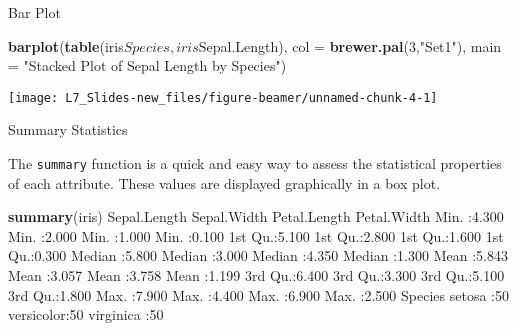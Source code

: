 \documentclass[ignorenonframetext,]{beamer}
\newenvironment{Shaded}{\begin{snugshade}}{\end{snugshade}}
\newcommand{\KeywordTok}[1]{\textcolor[rgb]{0.13,0.29,0.53}{\textbf{{#1}}}}
\newcommand{\DataTypeTok}[1]{\textcolor[rgb]{0.13,0.29,0.53}{{#1}}}
\newcommand{\DecValTok}[1]{\textcolor[rgb]{0.00,0.00,0.81}{{#1}}}
\newcommand{\FloatTok}[1]{\textcolor[rgb]{0.00,0.00,0.81}{{#1}}}
\newcommand{\StringTok}[1]{\textcolor[rgb]{0.31,0.60,0.02}{{#1}}}
\newcommand{\NormalTok}[1]{{#1}}
\begin{document}
\begin{frame}[fragile]{Bar Plot}

\small

\begin{Shaded}
\begin{Highlighting}[]
\KeywordTok{barplot}\NormalTok{(}\KeywordTok{table}\NormalTok{(iris$Species,iris$Sepal.Length), }
        \DataTypeTok{col  =} \KeywordTok{brewer.pal}\NormalTok{(}\DecValTok{3}\NormalTok{,}\StringTok{"Set1"}\NormalTok{), }
        \DataTypeTok{main =} \StringTok{"Stacked Plot of Sepal Length by Species"}\NormalTok{)}
\end{Highlighting}
\end{Shaded}

\begin{center}\texttt{[image: L7\_Slides-new\_files/figure-beamer/unnamed-chunk-4-1]} \end{center}

\end{frame}

\begin{frame}[fragile]{Summary Statistics}

The \texttt{summary} function is a quick and easy way to assess the
statistical properties of each attribute. These values are displayed
graphically in a box plot.

\small

\begin{Shaded}
\begin{Highlighting}[]
\KeywordTok{summary}\NormalTok{(iris)}
  \NormalTok{Sepal.Length    Sepal.Width     Petal.Length    Petal.Width   }
 \NormalTok{Min.   :}\FloatTok{4.300}   \NormalTok{Min.   :}\FloatTok{2.000}   \NormalTok{Min.   :}\FloatTok{1.000}   \NormalTok{Min.   :}\FloatTok{0.100}  
 \NormalTok{1st Qu.:}\FloatTok{5.100}   \NormalTok{1st Qu.:}\FloatTok{2.800}   \NormalTok{1st Qu.:}\FloatTok{1.600}   \NormalTok{1st Qu.:}\FloatTok{0.300}  
 \NormalTok{Median :}\FloatTok{5.800}   \NormalTok{Median :}\FloatTok{3.000}   \NormalTok{Median :}\FloatTok{4.350}   \NormalTok{Median :}\FloatTok{1.300}  
 \NormalTok{Mean   :}\FloatTok{5.843}   \NormalTok{Mean   :}\FloatTok{3.057}   \NormalTok{Mean   :}\FloatTok{3.758}   \NormalTok{Mean   :}\FloatTok{1.199}  
 \NormalTok{3rd Qu.:}\FloatTok{6.400}   \NormalTok{3rd Qu.:}\FloatTok{3.300}   \NormalTok{3rd Qu.:}\FloatTok{5.100}   \NormalTok{3rd Qu.:}\FloatTok{1.800}  
 \NormalTok{Max.   :}\FloatTok{7.900}   \NormalTok{Max.   :}\FloatTok{4.400}   \NormalTok{Max.   :}\FloatTok{6.900}   \NormalTok{Max.   :}\FloatTok{2.500}  
       \NormalTok{Species  }
 \NormalTok{setosa    :}\DecValTok{50}  
 \NormalTok{versicolor:}\DecValTok{50}  
 \NormalTok{virginica :}\DecValTok{50}  
                
                
                
\end{Highlighting}
\end{Shaded}

\end{frame}
\end{document}
